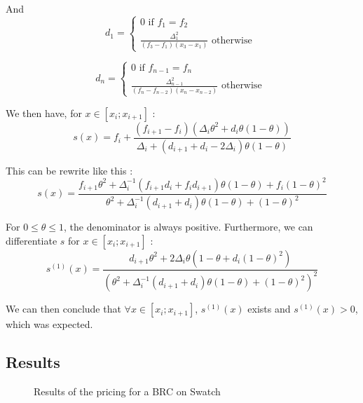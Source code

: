 \documentclass[a4paper,11pt,english]{book}
\begin{document}
And 
$$d_1 = \left\{
    \begin{array}{ll}
        0 \text{ if } f_{1}=f_2 \\
        \frac{\Delta_1^2}{(f_{3}-f_{1})(x_{3}-x_{1})} \text{ otherwise }
    \end{array}
\right.$$

$$d_n = \left\{
    \begin{array}{ll}
        0 \text{ if } f_{n-1}=f_n \\
        \frac{\Delta_{n-1}^2}{(f_{n}-f_{n-2})(x_{n}-x_{n-2})} \text{ otherwise }
    \end{array}
\right.$$

We then have, for $x\in [x_i;x_{i+1}]$ : $$s(x) = f_i + \frac{(f_{i+1}-f_{i})(\Delta_i\theta^2+d_i\theta(1-\theta))}{\Delta_i+(d_{i+1}+d_i-2\Delta_i)\theta(1-\theta)}$$

This can be rewrite like this :
$$s(x)=\frac{f_{i+1}\theta^2 + \Delta_i^{-1}(f_{i+1}d_i+f_id_{i+1})\theta(1-\theta)+f_i(1-\theta)^2}{\theta^2+\Delta_i^{-1}(d_{i+1}+d_i)\theta(1-\theta)+(1-\theta)^2}$$

For $0 \leq \theta \leq 1$, the denominator is always positive. Furthermore, we can differentiate $s$ for $x\in[x_i;x_{i+1}]$ :
$$s^{(1)}(x) = \frac{d_{i+1}\theta^2+2\Delta_i\theta(1-\theta+d_i(1-\theta)^2)}{(\theta^2+\Delta_i^{-1}(d_{i+1}+d_i)\theta(1-\theta)+(1-\theta)^2)^2}$$

We can then conclude that $\forall x\in[x_i;x_{i+1}]$, $s^{(1)}(x)$ exists and $s^{(1)}(x)>0$, which was expected.

\subsection{Results}

\begin{figure}[H]
\begin{center}
\label{brc-swatch}
    \caption{Results of the pricing for a BRC on Swatch}
\end{center}
\end{figure}
\end{document}
